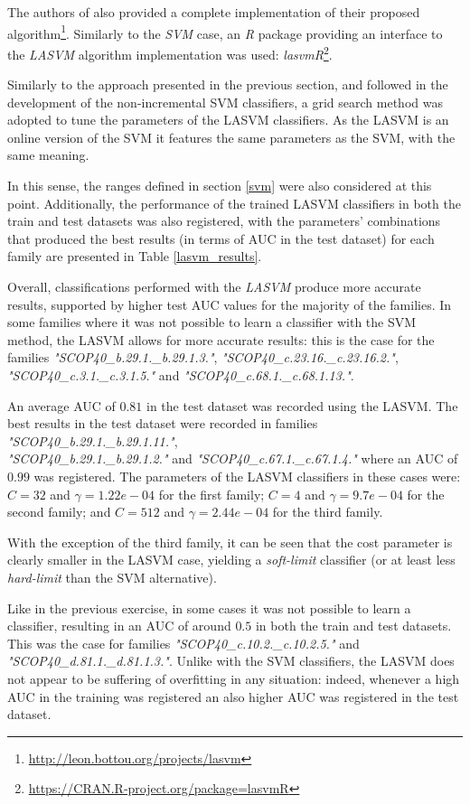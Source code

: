 \documentclass[11pt]{article}
\begin{document}
The authors of \cite{bordes-ertekin-weston-bottou-2005} also provided a complete implementation of their proposed algorithm\footnote{\url{http://leon.bottou.org/projects/lasvm}}. Similarly to the \emph{SVM} case, an \emph{R} package providing an interface to the \emph{LASVM} algorithm implementation was used: \emph{lasvmR}\footnote{\url{https://CRAN.R-project.org/package=lasvmR}}.

Similarly to the approach presented in the previous section, and followed in the development of the non-incremental SVM classifiers, a grid search method was adopted to tune the parameters of the LASVM classifiers. As the LASVM is an online version of the SVM it features the same parameters as the SVM, with the same meaning.

In this sense, the ranges defined in section \ref{svm} were also considered at this point. Additionally, the performance of the trained LASVM classifiers in both the train and test datasets was also registered, with the parameters' combinations that produced the best results (in terms of AUC in the test dataset) for each family are presented in Table \ref{lasvm_results}.

Overall, classifications performed with the \emph{LASVM} produce more accurate results, supported by higher test AUC values for the majority of the families. In some families where it was not possible to learn a classifier with the SVM method, the LASVM allows for more accurate results: this is the case for the families \emph{"SCOP40\_b.29.1.\_b.29.1.3."}, \emph{"SCOP40\_c.23.16.\_c.23.16.2."}, \emph{"SCOP40\_c.3.1.\_c.3.1.5."} and \emph{"SCOP40\_c.68.1.\_c.68.1.13."}.

An average AUC of $0.81$ in the test dataset was recorded using the LASVM. The best results in the test dataset were recorded in families \emph{"SCOP40\_b.29.1.\_b.29.1.11."},\\ \emph{"SCOP40\_b.29.1.\_b.29.1.2."} and \emph{"SCOP40\_c.67.1.\_c.67.1.4."} where an AUC of $0.99$ was registered. The parameters of the LASVM classifiers in these cases were: $C = 32$ and $\gamma = 1.22e-04$ for the first family; $C = 4$ and $\gamma = 9.7e-04$ for the second family; and $C = 512$ and $\gamma = 2.44e-04$ for the third family.

With the exception of the third family, it can be seen that the cost parameter is clearly smaller in the LASVM case, yielding a \emph{soft-limit} classifier (or at least less \emph{hard-limit} than the SVM alternative).

Like in the previous exercise, in some cases it was not possible to learn a classifier, resulting in an AUC of around $0.5$ in both the train and test datasets. This was the case for families \emph{"SCOP40\_c.10.2.\_c.10.2.5."} and \emph{"SCOP40\_d.81.1.\_d.81.1.3."}. Unlike with the SVM classifiers, the LASVM does not appear to be suffering of overfitting in any situation: indeed, whenever a high AUC in the training was registered an also higher AUC was registered in the test dataset.
\end{document}
